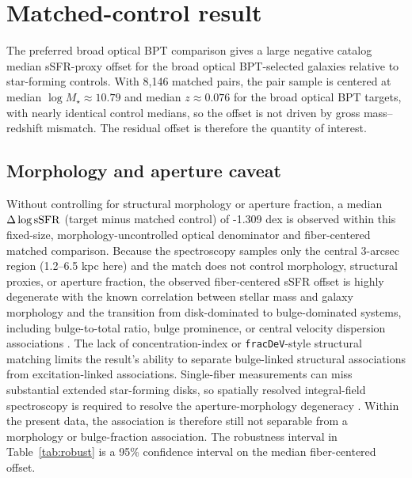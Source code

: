 \documentclass[twocolumn]{aastex631}
\begin{document}
\section{Matched-control result}
The preferred broad optical BPT comparison gives a large negative catalog median sSFR-proxy offset for the broad optical BPT-selected galaxies relative to star-forming controls.
With 8,146 matched pairs, the pair sample is centered at median $\log M_\star \approx 10.79$ and median $z \approx 0.076$ for the broad optical BPT targets, with nearly identical control medians, so the offset is not driven by gross mass--redshift mismatch. The residual offset is therefore the quantity of interest.
\subsection{Morphology and aperture caveat}
Without controlling for structural morphology or aperture fraction, a median $\Delta\log {\rm sSFR}$ (target minus matched control) of -1.309 dex is observed within this fixed-size, morphology-uncontrolled optical denominator and fiber-centered matched comparison. Because the spectroscopy samples only the central 3-arcsec region (1.2--6.5 kpc here) and the match does not control morphology, structural proxies, or aperture fraction, the observed fiber-centered sSFR offset is highly degenerate with the known correlation between stellar mass and galaxy morphology and the transition from disk-dominated to bulge-dominated systems, including bulge-to-total ratio, bulge prominence, or central velocity dispersion associations \citep{schawinski2010,bluck2014,piotrowska2022}. The lack of concentration-index or \texttt{fracDeV}-style structural matching limits the result's ability to separate bulge-linked structural associations from excitation-linked associations. Single-fiber measurements can miss substantial extended star-forming disks, so spatially resolved integral-field spectroscopy is required to resolve the aperture-morphology degeneracy \citep{penny2018,cheung2016,bundy2015,wake2017,canodiaz2016}. Within the present data, the association is therefore still not separable from a morphology or bulge-fraction association. The robustness interval in Table~\ref{tab:robust} is a 95\% confidence interval on the median fiber-centered offset.
\end{document}
